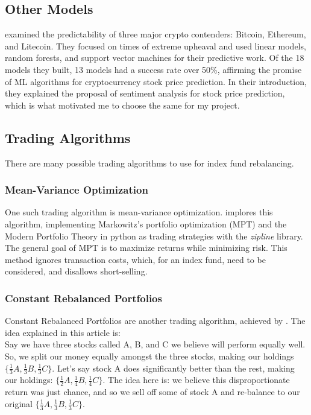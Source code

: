 \documentclass[10pt,twocolumn]{article}
\begin{document}
\subsection{Other Models}

\textcite{ForecastingAndTradingCryptoWithML} examined the predictability of three major crypto contenders: Bitcoin, Ethereum, and Litecoin. They focused on times of extreme upheaval and used linear models, random forests, and support vector machines for their predictive work. Of the 18 models they built, 13 models had a success rate over 50\%, affirming the promise of ML algorithms for cryptocurrency stock price prediction. In their introduction, they explained the proposal of sentiment analysis for stock price prediction, which is what motivated me to choose the same for my project.

\subsection{Trading Algorithms}

There are many possible trading algorithms to use for index fund rebalancing. 

\subsubsection{Mean-Variance Optimization}

One such trading algorithm is mean-variance optimization. \textcite{MeanVarianceAlgorithmicTrading} implores this algorithm, implementing Markowitz's portfolio optimization (MPT) and the Modern Portfolio Theory in python as trading strategies with the \textit{zipline} library. The general goal of MPT is to maximize returns while minimizing risk. This method ignores transaction costs, which, for an index fund, need to be considered, and disallows short-selling.

\subsubsection{Constant Rebalanced Portfolios}

Constant Rebalanced Portfolios are another trading algorithm, achieved by \textcite{ConstantRebalancedPortfolios}. The idea explained in this article is: \\

\noindent Say we have three stocks called A, B, and C we believe will perform equally well. So, we split our money equally amongst the three stocks, making our holdings $\{\frac{1}{3}A, \frac{1}{3}B, \frac{1}{3}C\}$. Let's say stock A does significantly better than the rest, making our holdings: $\{\frac{1}{2}A, \frac{1}{4}B, \frac{1}{4}C\}$. The idea here is: we believe this disproportionate return was just chance, and so we sell off some of stock A and re-balance to our original $\{\frac{1}{3}A, \frac{1}{3}B, \frac{1}{3}C\}$. \\
\end{document}
